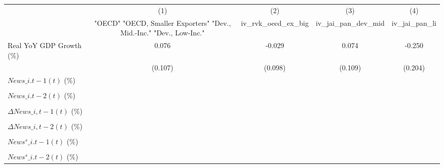 {
\def\sym#1{\ifmmode^{#1}\else\(^{#1}\)\fi}
\begin{tabular}{l*{4}{c}}
\toprule
                    &\multicolumn{1}{c}{(1)}&\multicolumn{1}{c}{(2)}&\multicolumn{1}{c}{(3)}&\multicolumn{1}{c}{(4)}\\
                    &\multicolumn{1}{c}{ "OECD" "OECD, Smaller Exporters" "Dev., Mid.-Inc." "Dev., Low-Inc."}&\multicolumn{1}{c}{iv\_rvk\_oecd\_ex\_big}&\multicolumn{1}{c}{iv\_jai\_pan\_dev\_mid}&\multicolumn{1}{c}{iv\_jai\_pan\_li}\\
\midrule
Real YoY GDP Growth (\%)&       0.076         &      -0.029         &       0.074         &      -0.250         \\
                    &     (0.107)         &     (0.098)         &     (0.109)         &     (0.204)         \\
\addlinespace
$ News\_{i.t-1}(t)$ (\%)&                     &                     &                     &                     \\
                    &                     &                     &                     &                     \\
\addlinespace
$ News\_{i.t-2}(t)$ (\%)&                     &                     &                     &                     \\
                    &                     &                     &                     &                     \\
\addlinespace
$ \Delta News\_{i,t-1}(t)$ (\%)&                     &                     &                     &                     \\
                    &                     &                     &                     &                     \\
\addlinespace
$ \Delta News\_{i,t-2}(t)$ (\%)&                     &                     &                     &                     \\
                    &                     &                     &                     &                     \\
\addlinespace
$ News^s\_{i.t-1}(t)$ (\%)&                     &                     &                     &                     \\
                    &                     &                     &                     &                     \\
\addlinespace
$ News^s\_{i.t-2}(t)$ (\%)&                     &                     &                     &                     \\

\end{tabular}}
